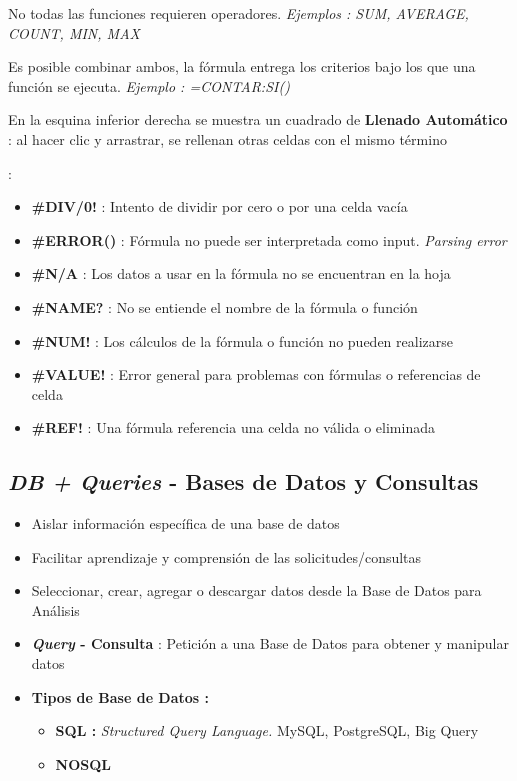 \begin{description}
{\begin{description}
        \item {No todas las funciones requieren operadores. \textit{Ejemplos : SUM, AVERAGE, COUNT, MIN, MAX}}
        \item {Es posible combinar ambos, la fórmula entrega los criterios bajo los que una función se ejecuta. \textit{Ejemplo : =CONTAR:SI()}}
        \item {En la esquina inferior derecha se muestra un cuadrado de \textbf{Llenado Automático} : al hacer clic y arrastrar, se rellenan otras celdas con el mismo término}
        \item[Errores Comunes]{ : 
        \begin{itemize}
            \item {\textbf{\#DIV/0!} : Intento de dividir por cero o por una celda vacía}
            \item {\textbf{\#ERROR()} : Fórmula no puede ser interpretada como input. \textit{Parsing error}}
            \item {\textbf{\#N/A} : Los datos a usar en la fórmula no se encuentran en la hoja}
            \item {\textbf{\#NAME?} : No se entiende el nombre de la fórmula o función}
            \item {\textbf{\#NUM!} : Los cálculos de la fórmula o función no pueden realizarse}
            \item {\textbf{\#VALUE!} : Error general para problemas con fórmulas o referencias de celda}
            \item {\textbf{\#REF!} : Una fórmula referencia una celda no válida o eliminada}
        \end{itemize}} 
    \end{description}}
\end{description}




\subsection{\textit{DB + Queries} - Bases de Datos y Consultas}
\begin{itemize}
    \item {Aislar información específica de una base de datos}
    \item {Facilitar aprendizaje y comprensión de las solicitudes/consultas}
    \item {Seleccionar, crear, agregar o descargar datos desde la Base de Datos para Análisis}
    \item {\textbf{\textit{Query} - Consulta} : Petición a una Base de Datos para obtener y manipular datos}
    \item {\textbf{Tipos de Base de Datos : }
    \begin{itemize}
        \item {\textbf{SQL : }\textit{Structured Query Language.} MySQL, PostgreSQL, Big Query}
        \item {\textbf{NOSQL}}
    \end{itemize}}
\end{itemize}

